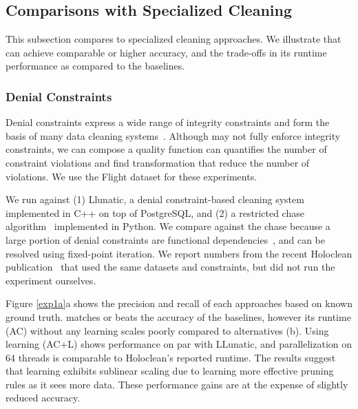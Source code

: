 \subsection{Comparisons with Specialized Cleaning}
This subsection compares \sys to specialized cleaning approaches.  We illustrate that \sys can achieve comparable or higher accuracy, and the trade-offs in its runtime performance as compared to the baselines.

\subsubsection{Denial Constraints}
Denial constraints express a wide range of integrity constraints and form the basis of many data cleaning systems~\cite{llunatic,chase,holoclean}.  Although \sys may not fully enforce integrity constraints, we can compose a quality function can quantifies the number of constraint violations and find transformation that reduce the number of violations.    We use the Flight dataset for these experiments.


 We run against (1) Llunatic, a denial constraint-based cleaning system~\cite{DBLP:conf/sigmod/DallachiesaEEEIOT13} implemented in C++ on top of PostgreSQL, and (2) a restricted chase algorithm~\cite{benedikt2017benchmarking} implemented in Python. We compare against the chase because a large portion of denial constraints are functional dependencies~\cite{}, and can be resolved using fixed-point iteration.  We report numbers from the recent Holoclean publication~\cite{rekatsinas2017holoclean} that used the same datasets and constraints, but did not run the experiment ourselves.

 Figure \ref{exp1a}a shows the precision and recall of each approaches based on known ground truth. \sys matches or beats the accuracy of the baselines, however its runtime (AC) without any learning scales poorly compared to alternatives (b).  Using learning (AC+L) shows performance on par with LLunatic, and parallelization on 64 threads is comparable to Holoclean's reported runtime. The results suggest that learning exhibits sublinear scaling due to \sys learning more effective pruning rules as it sees more data.  These performance gains are at the expense of slightly reduced accuracy. 

